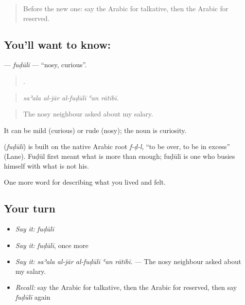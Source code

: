 \label{lesson:AR-C502-fuduli}



\begin{quote}
Before the new one: say the Arabic for talkative, then the Arabic for reserved.
\end{quote}

\subsection*{You'll want to know: }
\textbf{} — \emph{fuḍūlī} — \textquotedblleft{}nosy, curious\textquotedblright{}.

\begin{quote}
    .
\end{quote}

\begin{quote}
\emph{saʾala al-jār al-fuḍūlī ʿan rātibī.}
\end{quote}

\begin{quote}
The nosy neighbour asked about my salary.
\end{quote}

It can be mild (curious) or rude (nosy); the noun  is curiosity.

\begin{cousinweb}
\textbf{} (\emph{fuḍūlī}) is built on the native Arabic root \emph{f-ḍ-l}, \textquotedblleft{}to be over, to be in excess\textquotedblright{} (Lane). Fuḍūl first meant what is more than enough; fuḍūlī is one who busies himself with what is not his.
\end{cousinweb}

\begin{grammarlens}[title={What you've built}]
One more word for describing what you lived and felt.
\end{grammarlens}

\subsection*{Your turn}
\begin{itemize}
\raggedright
  \item \emph{Say it:} \emph{fuḍūlī}
  \item \emph{Say it:} \emph{fuḍūlī}, once more
  \item \emph{Say it:} \emph{saʾala al-jār al-fuḍūlī ʿan rātibī.} — The nosy neighbour asked about my salary.
  \item \emph{Recall:} say the Arabic for talkative, then the Arabic for reserved, then say \emph{fuḍūlī} again
\end{itemize}

